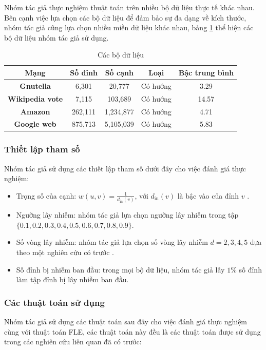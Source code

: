 Nhóm tác giả thực nghiệm thuật toán trên nhiều bộ dữ liệu thực tế khác nhau. Bên cạnh việc lựa chọn các bộ dữ liệu để đảm bảo sự đa dạng về kích thước, nhóm tác giả cũng lựa chọn nhiều miền dữ liệu khác nhau, bảng \ref{tab:Table1} thể hiện các bộ dữ liệu nhóm tác giả sử dụng.
\begin{table}
	\centering
	\begin{tabular}{|c|c|c|c|c|}
		\hline 
		\textbf{Mạng} & \textbf{Số đỉnh} & \textbf{Số cạnh} & \textbf{Loại} & \textbf{Bậc trung bình} \\ 
		\hline 
		\textbf{Gnutella} & 6,301 & 20,777 & Có hướng & 3.29 \\ 
		\hline 
		\textbf{Wikipedia vote} & 7,115 & 103,689 & Có hướng & 14.57 \\ 
		\hline 
		\textbf{Amazon} & 262,111 & 1,234,877 & Có hướng & 4.71 \\ 
		\hline 
		\textbf{Google web} & 875,713 & 5,105,039 & Có hướng & 5.83 \\ 
		\hline 
	\end{tabular} 
	\caption{Các bộ dữ liệu}
	\label{tab:Table1}
\end{table}

\subsubsection{Thiết lập tham số}
Nhóm tác giả sử dụng các thiết lập tham số dưới đây cho việc đánh giá thực nghiệm:

\begin{itemize}
	\item Trọng số của cạnh: $w(u,v)=\frac{1}{d_{\text{in}}(v)}$, với $d_{\text{in}}(v)$ là bậc vào của đỉnh $v$ \cite{kemple1} \cite{chen10LT} \cite{khali} \cite{amit21}.
	\item Ngưỡng lây nhiễm: nhóm tác giả lựa chọn ngưỡng lây nhiễm trong tập \\ $\{0.1, 0.2, 0.3, 0.4, 0.5, 0.6, 0.7, 0.8, 0.9\}$.
	\item Số vòng lây nhiễm: nhóm tác giả lựa chọn số vòng lây nhiễm $d = 2, 3, 4, 5$ dựa theo một nghiên cứu có trước \cite{cha23}.
	\item Số đỉnh bị nhiễm ban đầu: trong mọi bộ dữ liệu, nhóm tác giả lấy $1\%$ số đỉnh làm tập đỉnh bị lây nhiễm ban đầu. 
\end{itemize}

\subsubsection{Các thuật toán sử dụng}
Nhóm tác giả sử dụng các thuật toán sau đây cho việc đánh giá thực nghiệm cùng với thuật toán FLE, các thuật toán này đều là các thuật toán được sử dụng trong các nghiên cứu liên quan đã có trước:

